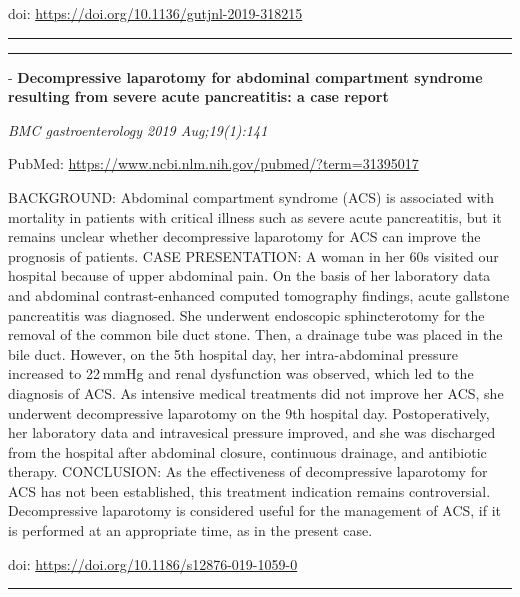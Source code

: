 \documentclass[]{article}
\begin{document}
doi: \url{https://doi.org/10.1136/gutjnl-2019-318215}

{}

{}

\begin{center}\rule{0.5\linewidth}{\linethickness}\end{center}

\begin{center}\rule{0.5\linewidth}{\linethickness}\end{center}

 - \textbf{Decompressive laparotomy for abdominal compartment syndrome
resulting from severe acute pancreatitis: a case report}

\emph{BMC gastroenterology 2019 Aug;19(1):141}

PubMed: \url{https://www.ncbi.nlm.nih.gov/pubmed/?term=31395017}

BACKGROUND: Abdominal compartment syndrome (ACS) is associated with
mortality in patients with critical illness such as severe acute
pancreatitis, but it remains unclear whether decompressive laparotomy
for ACS can improve the prognosis of patients. CASE PRESENTATION: A
woman in her 60s visited our hospital because of upper abdominal pain.
On the basis of her laboratory data and abdominal contrast-enhanced
computed tomography findings, acute gallstone pancreatitis was
diagnosed. She underwent endoscopic sphincterotomy for the removal of
the common bile duct stone. Then, a drainage tube was placed in the bile
duct. However, on the 5th hospital day, her intra-abdominal pressure
increased to 22 mmHg and renal dysfunction was observed, which led to
the diagnosis of ACS. As intensive medical treatments did not improve
her ACS, she underwent decompressive laparotomy on the 9th hospital day.
Postoperatively, her laboratory data and intravesical pressure improved,
and she was discharged from the hospital after abdominal closure,
continuous drainage, and antibiotic therapy. CONCLUSION: As the
effectiveness of decompressive laparotomy for ACS has not been
established, this treatment indication remains controversial.
Decompressive laparotomy is considered useful for the management of ACS,
if it is performed at an appropriate time, as in the present case.

doi: \url{https://doi.org/10.1186/s12876-019-1059-0}

{}

{}

\begin{center}\rule{0.5\linewidth}{\linethickness}\end{center}
\end{document}
